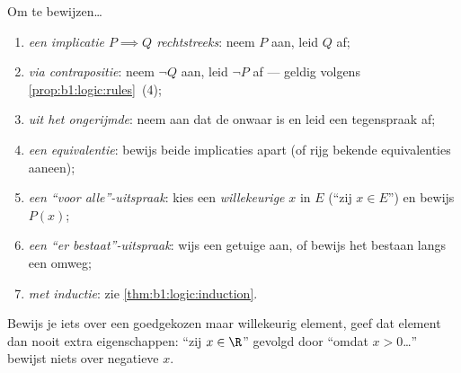 \begin{method}\label{met:b1:logic:proofs}
Om te bewijzen\dots
\begin{enumerate}
  \item \emph{een implicatie $P \implies Q$ rechtstreeks}: neem $P$ aan,
        leid $Q$ af;
  \item \emph{via contrapositie}: neem $\lnot Q$ aan, leid $\lnot P$ af
        --- geldig volgens \cref{prop:b1:logic:rules}~(4);
  \item \emph{uit het ongerijmde}: neem aan dat de  onwaar is en
        leid een tegenspraak af;
  \item \emph{een equivalentie}: bewijs beide implicaties apart (of rijg
        bekende equivalenties aaneen);
  \item \emph{een ``voor alle''-uitspraak}: kies een \emph{willekeurige}
        $x$ in $E$ (``zij $x \in E$'') en bewijs $P(x)$;
  \item \emph{een ``er bestaat''-uitspraak}: wijs een getuige aan, of
        bewijs het bestaan langs een omweg;
  \item \emph{met inductie}: zie \cref{thm:b1:logic:induction}.
\end{enumerate}
Bewijs je iets over een goedgekozen maar willekeurig element, geef dat
element dan nooit extra eigenschappen: ``zij $x \in \R$'' gevolgd door
``omdat $x > 0$\dots'' bewijst niets over negatieve $x$.
\end{method}

